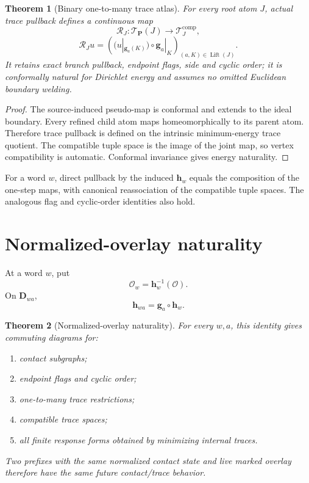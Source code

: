 \documentclass[11pt]{article}
\newtheorem{theorem}{Theorem}[section]
\theoremstyle{definition}
\theoremstyle{remark}
\newcommand{\T}{\mathcal T}
\newcommand{\PP}{\mathbf P}
\begin{document}
\begin{theorem}[Binary one-to-many trace atlas]
For every root atom $J$, actual trace pullback defines a continuous map
\[
 \mathcal R_J:\T_{\PP}(J)\longrightarrow
 \T_J^{\mathrm{comp}},
\]
\[
 \mathcal R_Ju=
 \left((u|_{\mathbf g_a(K)})\circ\mathbf g_a|_K\right)_{(a,K)\in\operatorname{Lift}(J)}.
\]
It retains exact branch pullback, endpoint flags, side and cyclic order; it is
conformally natural for Dirichlet energy and assumes no omitted Euclidean
boundary welding.
\end{theorem}

\begin{proof}
The source-induced pseudo-map is conformal and extends to the ideal boundary.
Every refined child atom maps homeomorphically to its parent atom.  Therefore
trace pullback is defined on the intrinsic minimum-energy trace quotient.  The
compatible tuple space is the image of the joint map, so vertex compatibility
is automatic.  Conformal invariance gives energy naturality.
\end{proof}

For a word $w$, direct pullback by the induced $\mathbf h_w$ equals the
composition of the one-step maps, with canonical reassociation of the
compatible tuple spaces.  The analogous flag and cyclic-order identities also
hold.

\section{Normalized-overlay naturality}
At a word $w$, put
\[
 \mathscr O_w=\mathbf h_w^{-1}(\mathscr O).
\]
On $\mathbf D_{wa}$,
\[
 \boxed{\mathbf h_{wa}=\mathbf g_a\circ\mathbf h_w.}
\]

\begin{theorem}[Normalized-overlay naturality]
For every $w,a$, this identity gives commuting diagrams for:
\begin{enumerate}
\item contact subgraphs;
\item endpoint flags and cyclic order;
\item one-to-many trace restrictions;
\item compatible trace spaces;
\item all finite response forms obtained by minimizing internal traces.
\end{enumerate}
Two prefixes with the same normalized contact state and live marked overlay
therefore have the same future contact/trace behavior.
\end{theorem}
\end{document}
